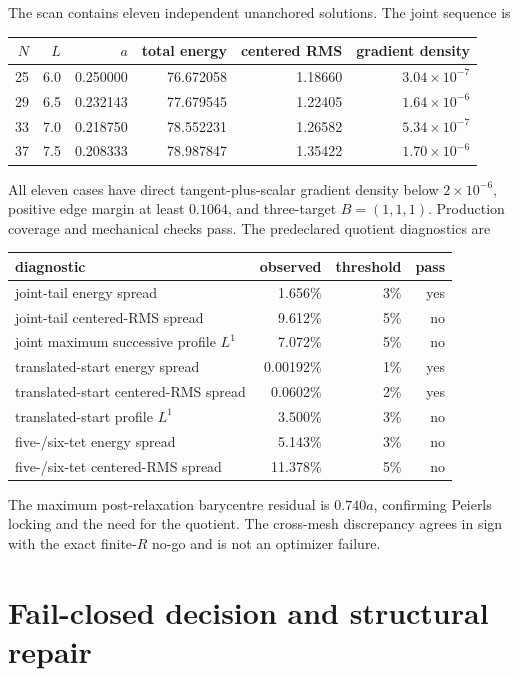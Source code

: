 \documentclass[11pt]{article}
\numberwithin{equation}{section}
\theoremstyle{definition}
\theoremstyle{remark}
\begin{document}
The scan contains eleven independent unanchored solutions.  The joint
sequence is
\begin{center}
\begin{tabular}{rrrrrr}
\toprule
$N$&$L$&$a$&total energy&centered RMS&gradient density\\
\midrule
25&6.0&0.250000&76.672058&1.18660&$3.04\times10^{-7}$\\
29&6.5&0.232143&77.679545&1.22405&$1.64\times10^{-6}$\\
33&7.0&0.218750&78.552231&1.26582&$5.34\times10^{-7}$\\
37&7.5&0.208333&78.987847&1.35422&$1.70\times10^{-6}$\\
\bottomrule
\end{tabular}
\end{center}
All eleven cases have direct tangent-plus-scalar gradient density below
$2\times10^{-6}$, positive edge margin at least $0.1064$, and three-target
$B=(1,1,1)$.  Production coverage and mechanical checks pass.  The
predeclared quotient diagnostics are
\begin{center}
\begin{tabular}{lrrr}
\toprule
diagnostic&observed&threshold&pass\\
\midrule
joint-tail energy spread&1.656\%&3\%&yes\\
joint-tail centered-RMS spread&9.612\%&5\%&no\\
joint maximum successive profile $L^1$&7.072\%&5\%&no\\
translated-start energy spread&0.00192\%&1\%&yes\\
translated-start centered-RMS spread&0.0602\%&2\%&yes\\
translated-start profile $L^1$&3.500\%&3\%&no\\
five-/six-tet energy spread&5.143\%&3\%&no\\
five-/six-tet centered-RMS spread&11.378\%&5\%&no\\
\bottomrule
\end{tabular}
\end{center}
The maximum post-relaxation barycentre residual is $0.740a$, confirming
Peierls locking and the need for the quotient.  The cross-mesh discrepancy
agrees in sign with the exact finite-$R$ no-go and is not an optimizer
failure.

\section{Fail-closed decision and structural repair}
\end{document}
